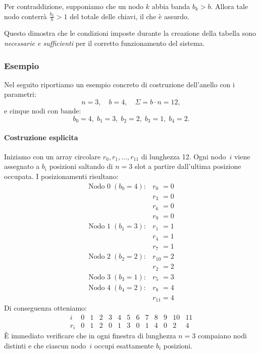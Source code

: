 Per contraddizione, supponiamo che un nodo $k$ abbia banda $b_k > b$.
Allora tale nodo conterrà $\displaystyle \frac{b_k}{b} > 1$ del totale delle chiavi, il che è assurdo.

Questo dimostra che le condizioni imposte durante la creazione della tabella sono \emph{necessarie e sufficienti} per il corretto funzionamento del sistema.

\subsubsection{Esempio}
\label{subsubsec:anello-esempio}

Nel seguito riportiamo un esempio concreto di costruzione dell'anello con i parametri:
\[
    n = 3,\quad
    b = 4,\quad
    \Sigma = b \cdot n = 12,
\]
e cinque nodi con bande:
\[
    b_0 = 4,\; b_1 = 3,\; b_2 = 2,\; b_3 = 1,\; b_4 = 2.
\]

\paragraph{Costruzione esplicita}
Iniziamo con un array circolare \(r_0, r_1, \dots, r_{11}\) di lunghezza 12. Ogni nodo~\(i\) viene assegnato a \(b_i\) posizioni saltando di \(n=3\) slot a partire dall'ultima posizione occupata.
I posizionamenti risultano:
\[
    \begin{array}{rl}
        \text{Nodo }0\;(b_0=4): & r_{0\phantom{0}} = 0 \\
                                & r_{3\phantom{0}} = 0 \\
                                & r_{6\phantom{0}} = 0 \\
                                & r_{9\phantom{0}} = 0 \\[0.5ex]
        \text{Nodo }1\;(b_1=3): & r_{1\phantom{0}} = 1 \\
                                & r_{4\phantom{0}} = 1 \\
                                & r_{7\phantom{0}} = 1 \\[0.5ex]
        \text{Nodo }2\;(b_2=2): & r_{10} = 2 \\
                                & r_{2\phantom{0}} = 2 \\[0.5ex]
        \text{Nodo }3\;(b_3=1): & r_{5\phantom{0}} = 3 \\[0.5ex]
        \text{Nodo }4\;(b_4=2): & r_{8\phantom{0}} = 4 \\
                                & r_{11} = 4
    \end{array}
\]
Di conseguenza otteniamo:
\[
    \begin{array}{c|cccccccccccc}
        i   & 0 & 1 & 2 & 3 & 4 & 5 & 6 & 7 & 8 & 9 & 10 & 11\\\hline
        r_i & 0 & 1 & 2 & 0 & 1 & 3 & 0 & 1 & 4 & 0 & 2  & 4
    \end{array}
\]
È immediato verificare che in ogni finestra di lunghezza \(n=3\) compaiano nodi distinti e che ciascun nodo~\(i\) occupi esattamente \(b_i\) posizioni.


